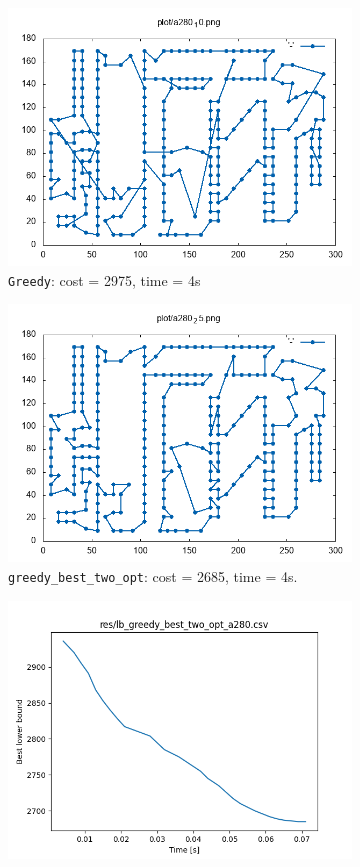 \begin{figure}[!h]
	\begin{subfigure}{.5\columnwidth}
		\centering
		\includegraphics[width=0.9\columnwidth]{../res/a280_10.png}
		\caption{\texttt{Greedy}: cost = 2975, time = 4s}
		\label{fig:a280_10}
	\end{subfigure}
	\begin{subfigure}{.5\columnwidth}
		\centering
		\includegraphics[width=0.9\columnwidth]{../res/a280_25.png}
		\caption{\texttt{greedy\_best\_two\_opt}: cost = 2685, time = 4s.}
		\label{fig:a280_25}
	\end{subfigure}
	\begin{subfigure}{.5\columnwidth}
		\centering
		\includegraphics[width=0.9\columnwidth]{../res/lb_greedy_best_two_opt_a280.png}

\end{subfigure}
\end{figure}
